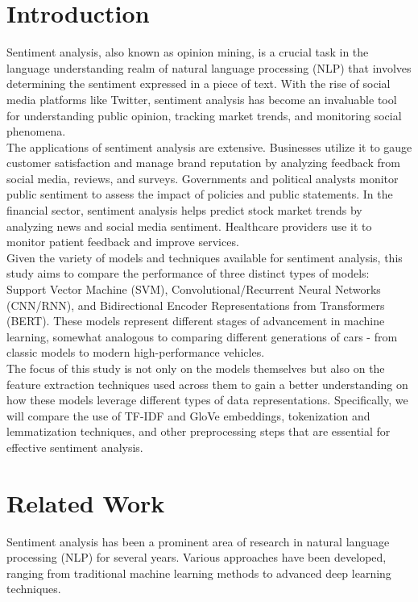 \documentclass[12pt]{article}
\begin{document}
\section{Introduction}
Sentiment analysis, also known as opinion mining, is a crucial task in the language understanding realm of natural language processing (NLP) that involves determining the sentiment expressed in a piece of text. With the rise of social media platforms like Twitter, sentiment analysis has become an invaluable tool for understanding public opinion, tracking market trends, and monitoring social phenomena. \\

The applications of sentiment analysis are extensive. Businesses utilize it to gauge customer satisfaction and manage brand reputation by analyzing feedback from social media, reviews, and surveys. Governments and political analysts monitor public sentiment to assess the impact of policies and public statements. In the financial sector, sentiment analysis helps predict stock market trends by analyzing news and social media sentiment. Healthcare providers use it to monitor patient feedback and improve services.\\

Given the variety of models and techniques available for sentiment analysis, this study aims to compare the performance of three distinct types of models: Support  Vector Machine (SVM), Convolutional/Recurrent Neural Networks (CNN/RNN), and Bidirectional Encoder Representations from Transformers (BERT). These models represent different stages of advancement in machine learning, somewhat analogous to comparing different generations of cars - from classic models to modern high-performance vehicles.\\

The focus of this study is not only on the models themselves but also on the feature extraction techniques used across them to gain a better understanding on how these models leverage different types of data representations. Specifically, we will compare the use of TF-IDF and GloVe embeddings, tokenization and lemmatization techniques, and other preprocessing steps that are essential for effective sentiment analysis.\\


\section{Related Work}
Sentiment analysis has been a prominent area of research in natural language processing (NLP) for several years. Various approaches have been developed, ranging from traditional machine learning methods to advanced deep learning techniques.
\end{document}
